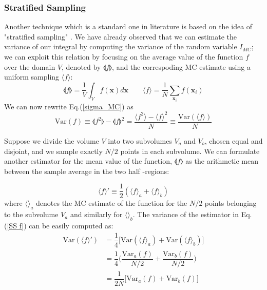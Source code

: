 \documentclass[../main/main.tex]{subfiles}
\begin{document}
\subsubsection{Stratified Sampling}
Another technique which is a standard one in literature is based on the idea of  "stratified sampling" \cite{Press:1989vk, Press:1992zz}.
We have already observed that we can estimate the variance of our integral by computing the variance of the random variable $I_{MC}$; we can exploit this relation by focusing on the average value of the function $f$ over the domain $V$, denoted by $\llangle  f \rrangle $, and the correspoding MC estimate using a uniform sampling $ \langle f \rangle$:
\begin{equation}
	\llangle  f \rrangle = \frac{1}{V} \int_V f(\textbf{x}) d\textbf{x} \quad \quad 
	\langle f \rangle = \frac{1}{N} \sum_{\textbf{x}_i} f(\textbf{x}_i)
\end{equation}
We can now rewrite Eq.(\ref{sigma_MC}) as  
\begin{equation}
	\text{Var}( f ) \equiv \llangle f^2 \rrangle - \llangle f \rrangle ^2 = \frac{\langle f^2 \rangle - \langle f \rangle^2}{N} \equiv \frac{\text{Var}(\langle f \rangle )}{N}
\end{equation}

Suppose we divide the volume $V$ into two subvolumes $V_a$  and $V_b$, chosen equal and disjoint, and we sample exactly $N/2$ points in each subvolume. We can formulate another estimator for the mean value of the function, $\llangle f \rrangle $ as the arithmetic mean between the sample average
in the two half -regions:

\begin{equation}
	\label {SS f}
	\langle f  \rangle ' \equiv \frac{1}{2} (  \langle f \rangle_a + \langle f \rangle_b )
\end{equation}
where $\langle \rangle_a$ denotes the MC estimate of the function for the $N/2$ points belonging to the subvolume $V_a$ and similarly for $\langle \rangle_b$.
The variance of the estimator in Eq.(\ref{SS f}) can be easily computed as:
\begin{eqnarray}
	\text{Var}(\langle f \rangle ') &= \dfrac{1}{4}  \big[  \text{Var}(\langle f \rangle_a) +\text{Var}(\langle f \rangle_b)  \big]  \\
	&= \dfrac{1}{4} \bigg(  \dfrac{\text{Var}_a(f)}{N/2} +\dfrac{\text{Var}_b(f)}{N/2} \bigg) \\
	&= \dfrac{1}{2N} \big[ \text{Var}_a(f) + \text{Var}_b(f)\big] \label{var_stratified}
	\label{ SS var}
\end{eqnarray}
\end{document}
